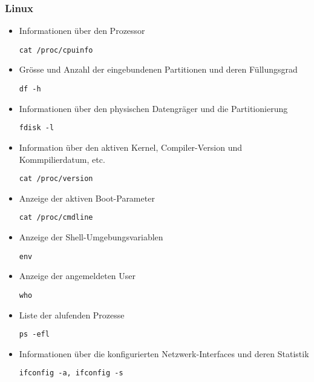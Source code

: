\subsubsection{Linux}
\begin{itemize}
\item Informationen über den Prozessor 
\begin{lstlisting}
cat /proc/cpuinfo
\end{lstlisting}

\item Grösse und Anzahl der eingebundenen Partitionen und deren Füllungsgrad 
\begin{lstlisting}
df -h
\end{lstlisting}

\item  Informationen über den physischen Datengräger und die Partitionierung
\begin{lstlisting}
fdisk -l
\end{lstlisting}

\item  Information über den aktiven Kernel, Compiler-Version und Kommpilierdatum, etc.
\begin{lstlisting}
cat /proc/version
\end{lstlisting}

\item  Anzeige der aktiven Boot-Parameter
\begin{lstlisting}
cat /proc/cmdline
\end{lstlisting}


\item  Anzeige der Shell-Umgebungsvariablen
\begin{lstlisting}
env
\end{lstlisting}

\item  Anzeige der angemeldeten User
\begin{lstlisting}
who
\end{lstlisting}

\item  Liste der alufenden Prozesse
\begin{lstlisting}
ps -efl
\end{lstlisting}

\item  Informationen über die konfigurierten Netzwerk-Interfaces und deren Statistik 
\begin{lstlisting}
ifconfig -a, ifconfig -s
\end{lstlisting}


\end{itemize}
